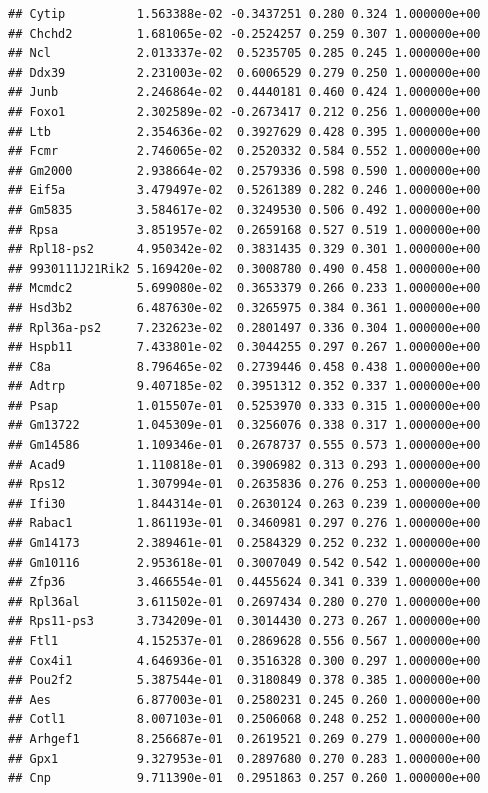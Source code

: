 \documentclass[
]{article}
\begin{document}
\begin{verbatim}
## Cytip          1.563388e-02 -0.3437251 0.280 0.324 1.000000e+00
## Chchd2         1.681065e-02 -0.2524257 0.259 0.307 1.000000e+00
## Ncl            2.013337e-02  0.5235705 0.285 0.245 1.000000e+00
## Ddx39          2.231003e-02  0.6006529 0.279 0.250 1.000000e+00
## Junb           2.246864e-02  0.4440181 0.460 0.424 1.000000e+00
## Foxo1          2.302589e-02 -0.2673417 0.212 0.256 1.000000e+00
## Ltb            2.354636e-02  0.3927629 0.428 0.395 1.000000e+00
## Fcmr           2.746065e-02  0.2520332 0.584 0.552 1.000000e+00
## Gm2000         2.938664e-02  0.2579336 0.598 0.590 1.000000e+00
## Eif5a          3.479497e-02  0.5261389 0.282 0.246 1.000000e+00
## Gm5835         3.584617e-02  0.3249530 0.506 0.492 1.000000e+00
## Rpsa           3.851957e-02  0.2659168 0.527 0.519 1.000000e+00
## Rpl18-ps2      4.950342e-02  0.3831435 0.329 0.301 1.000000e+00
## 9930111J21Rik2 5.169420e-02  0.3008780 0.490 0.458 1.000000e+00
## Mcmdc2         5.699080e-02  0.3653379 0.266 0.233 1.000000e+00
## Hsd3b2         6.487630e-02  0.3265975 0.384 0.361 1.000000e+00
## Rpl36a-ps2     7.232623e-02  0.2801497 0.336 0.304 1.000000e+00
## Hspb11         7.433801e-02  0.3044255 0.297 0.267 1.000000e+00
## C8a            8.796465e-02  0.2739446 0.458 0.438 1.000000e+00
## Adtrp          9.407185e-02  0.3951312 0.352 0.337 1.000000e+00
## Psap           1.015507e-01  0.5253970 0.333 0.315 1.000000e+00
## Gm13722        1.045309e-01  0.3256076 0.338 0.317 1.000000e+00
## Gm14586        1.109346e-01  0.2678737 0.555 0.573 1.000000e+00
## Acad9          1.110818e-01  0.3906982 0.313 0.293 1.000000e+00
## Rps12          1.307994e-01  0.2635836 0.276 0.253 1.000000e+00
## Ifi30          1.844314e-01  0.2630124 0.263 0.239 1.000000e+00
## Rabac1         1.861193e-01  0.3460981 0.297 0.276 1.000000e+00
## Gm14173        2.389461e-01  0.2584329 0.252 0.232 1.000000e+00
## Gm10116        2.953618e-01  0.3007049 0.542 0.542 1.000000e+00
## Zfp36          3.466554e-01  0.4455624 0.341 0.339 1.000000e+00
## Rpl36al        3.611502e-01  0.2697434 0.280 0.270 1.000000e+00
## Rps11-ps3      3.734209e-01  0.3014430 0.273 0.267 1.000000e+00
## Ftl1           4.152537e-01  0.2869628 0.556 0.567 1.000000e+00
## Cox4i1         4.646936e-01  0.3516328 0.300 0.297 1.000000e+00
## Pou2f2         5.387544e-01  0.3180849 0.378 0.385 1.000000e+00
## Aes            6.877003e-01  0.2580231 0.245 0.260 1.000000e+00
## Cotl1          8.007103e-01  0.2506068 0.248 0.252 1.000000e+00
## Arhgef1        8.256687e-01  0.2619521 0.269 0.279 1.000000e+00
## Gpx1           9.327953e-01  0.2897680 0.270 0.283 1.000000e+00
## Cnp            9.711390e-01  0.2951863 0.257 0.260 1.000000e+00
\end{verbatim}
\end{document}
